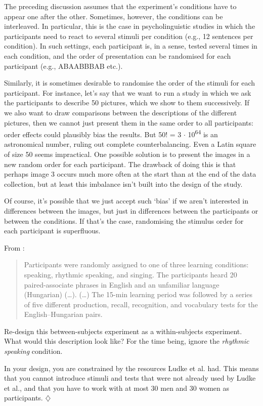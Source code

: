 \documentclass[a4paper]{tufte-book}\usepackage[]{graphicx}\usepackage[]{xcolor}
\newcommand*{\parend}[1][$\diamondsuit$]{%
  \unskip\nobreak\hspace{1em plus 1fill}$\diamondsuit$%
}
\begin{document}
The preceding discussion assumes that the experiment's conditions
have to appear one after the other.
Sometimes, however, the conditions can be interleaved.
In particular, this is the case in psycholinguistic studies in which
the participants need to react to several stimuli per condition
(e.g., 12 sentences per condition).
In such settings, each participant is, in a sense, tested several times
in each condition, and the order of presentation can be randomised
for each participant (e.g., ABAABBBAB etc.).

Similarly, it is sometimes desirable to randomise the order of the stimuli
for each participant.
For instance, let's say that we want to run a study
in which we ask the participants to describe 50 pictures,
which we show to them successively. 
If we also want to draw comparisons between the descriptions 
of the different pictures, 
then we cannot just present them in the same order to all participants: 
order effects could plausibly
bias the results.
But 50! = 3 $\cdot$ 10\textsuperscript{64} is an astronomical number, ruling out
complete counterbalancing.
Even a Latin square of size 50 seems impractical.
One possible solution is to present the images in a new random order for each
participant.
The drawback of doing this is that perhaps image 3 occurs 
much more often at the start than at the end of the data collection,
but at least this imbalance isn't built into the design of the study.

Of course, it's possible that we just accept such `bias' if we aren't interested
in differences between the images, but just in differences between
the participants or between the conditions. 
If that's the case, randomising the stimulus order for each participant is superfluous.

From \citet{Ludke2014}:
 \begin{quote}
Participants were randomly assigned to one of three learning conditions:
speaking, rhythmic speaking, and singing. The participants heard 20 paired-associate
phrases in English and an unfamiliar language (Hungarian) (\dots).
(\dots) The 15-min learning period was followed by a series of five different production,
recall, recognition, and vocabulary tests for the English--Hungarian pairs.
\end{quote}
Re-design this between-subjects experiment as a within-subjects experiment.
What would this description look like? For the time being, ignore the \textit{rhythmic speaking} condition.

In your design, you are constrained by the resources Ludke et al. had. This means that
you cannot introduce stimuli and tests that were not already used by Ludke et al., and
that you have to work with at most 30 men and 30 women as participants.
\parend
\end{document}

